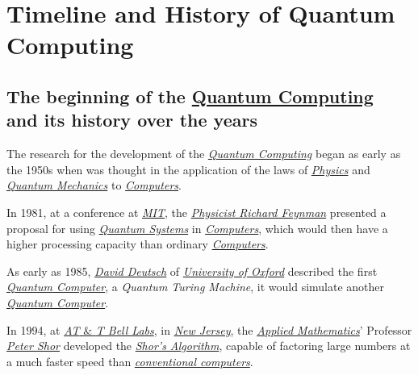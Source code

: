 \documentclass[conference]{IEEEtran}
\begin{document}
\newpage

\section{Timeline and History of Quantum Computing}

\subsection{The beginning of the \href{https://en.wikipedia.org/wiki/Quantum_computing}{Quantum Computing}\\ and its history over the years}\label{AA}

The research for the development of the \href{https://en.wikipedia.org/wiki/Quantum_computing}{\textit{Quantum Computing}} began as early as the 1950s when was thought in the application of the laws of \href{https://en.wikipedia.org/wiki/Physics}{\textit{Physics}} and \href{https://en.wikipedia.org/wiki/Quantum_mechanics}{\textit{Quantum Mechanics}} to \href{https://en.wikipedia.org/wiki/Computer}{\textit{Computers}}.

\vspace{4pt}

In 1981, at a conference at \href{https://en.wikipedia.org/wiki/Massachusetts_Institute_of_Technology}{\textit{MIT}}, the \href{https://en.wikipedia.org/wiki/Richard_Feynman}{\textit{Physicist Richard Feynman}} presented a proposal for using \href{https://en.wikipedia.org/wiki/Quantum_system}{\textit{Quantum Systems}} in \href{https://en.wikipedia.org/wiki/Computer}{\textit{Computers}}, which would then have a higher processing capacity than ordinary \href{https://en.wikipedia.org/wiki/Computer}{\textit{Computers}}.\cite{b1}

\vspace{4pt}

As early as 1985, \href{https://en.wikipedia.org/wiki/David_Deutsch}{\textit{David Deutsch}} of \href{https://en.wikipedia.org/wiki/University_of_Oxford}{\textit{University of Oxford}} described the first \href{https://en.wikipedia.org/wiki/Quantum_computing}{\textit{Quantum Computer}}, a \textit{Quantum Turing Machine}, it would simulate another \href{https://en.wikipedia.org/wiki/Quantum_computing}{\textit{Quantum Computer}}.\cite{b2}

\vspace{4pt}

In 1994, at \href{https://en.wikipedia.org/wiki/Bell_Labs}{\textit{AT} \& \textit{T Bell Labs}}, in \href{https://en.wikipedia.org/wiki/New_Jersey}{\textit{New Jersey}}, the \href{https://en.wikipedia.org/wiki/Applied_mathematics}{\textit{Applied Mathematics}}' Professor \href{https://en.wikipedia.org/wiki/Peter_Shor}{\textit{Peter Shor}} developed the \href{https://en.wikipedia.org/wiki/Shor\%27s_algorithm}{\textit{Shor's Algorithm}}, capable of factoring large numbers at a much faster speed than \href{https://en.wikipedia.org/wiki/Von_Neumann_architecture}{\textit{conventional computers}}. \cite{b3}
\end{document}

